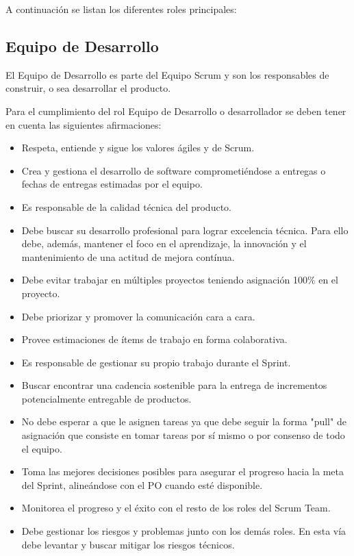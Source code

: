 A continuación se listan los diferentes roles principales:

\subsection{Equipo de Desarrollo}

El Equipo de Desarrollo es parte del Equipo Scrum y son los responsables de construir, o sea desarrollar el producto.
 
Para el cumplimiento del rol Equipo de Desarrollo o desarrollador se deben tener en cuenta las siguientes afirmaciones:

\begin{itemize}
\item Respeta, entiende y sigue los valores ágiles y de Scrum.
\item Crea y gestiona el desarrollo de software comprometiéndose a entregas o fechas de entregas estimadas por el equipo.
\item Es responsable de la calidad técnica del producto.
\item Debe buscar su desarrollo profesional para lograr excelencia técnica. Para ello debe, además, mantener el foco en el aprendizaje, la innovación y el mantenimiento de una actitud de mejora contínua.
\item Debe evitar trabajar en múltiples proyectos teniendo asignación 100\% en el proyecto.
\item Debe priorizar y promover la comunicación cara a cara.
\item Provee estimaciones de ítems de trabajo en forma colaborativa. 
\item Es responsable de gestionar su propio trabajo durante el Sprint.
\item Buscar encontrar una cadencia sostenible para la entrega de incrementos potencialmente entregable de productos.
\item No debe esperar a que le asignen tareas ya que debe seguir la forma "pull" de asignación que consiste en tomar tareas por sí mismo o por consenso de todo el equipo.
\item Toma las mejores decisiones posibles para asegurar el progreso hacia la meta del Sprint, alineándose con el PO cuando esté disponible.
\item Monitorea el progreso y el éxito con el resto de los roles del Scrum Team.
\item Debe gestionar los riesgos y problemas junto con los demás roles. En esta vía debe levantar y buscar mitigar los riesgos técnicos.

\end{itemize}
